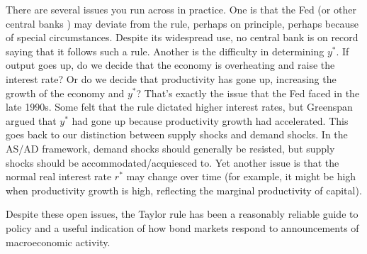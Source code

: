 There are several issues you run across in practice.
One is that the Fed (or other central banks ) may deviate from
the rule, perhaps on principle, perhaps because of special circumstances.
Despite its widespread use, no central bank  is on record
saying that it follows such a rule.
Another is the difficulty in determining $y^*$.
If output goes up, do we decide that the economy is overheating
and raise the interest rate?
Or do we decide that productivity has gone up,
increasing the growth of the economy and $y^*$?
That's exactly the issue that the Fed faced in the late 1990s.
Some felt that the rule dictated higher interest rates,
but Greenspan argued that $y^*$ had gone up because
productivity growth had accelerated.
This goes back to our distinction between
supply shocks and demand shocks. 
In the AS/AD framework,
demand shocks should generally be resisted,
but supply shocks should be accommodated/acquiesced to. Yet another issue is that the
normal real interest rate $r^*$ may change over time (for example, it might be high
when productivity growth is high, reflecting the marginal productivity  of capital).

Despite these open issues, the Taylor rule has been a reasonably
reliable guide to policy
and a useful indication of how bond  markets respond to announcements
of macroeconomic activity.



